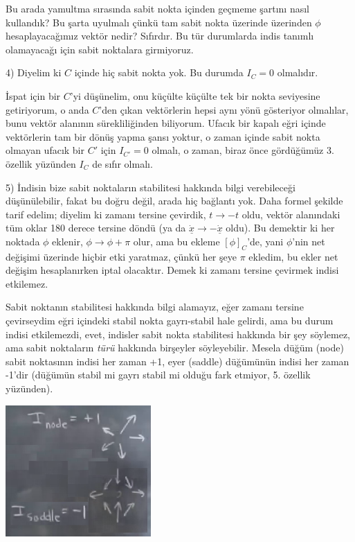 \documentclass[12pt,fleqn]{article}\usepackage{../../common}
\begin{document}
Bu arada yamultma sırasında sabit nokta içinden geçmeme şartını nasıl kullandık?
Bu şarta uyulmalı çünkü tam sabit nokta üzerinde üzerinden $\phi$
hesaplayacağımız vektör nedir? Sıfırdır. Bu tür durumlarda indis tanımlı
olamayacağı için sabit noktalara girmiyoruz.

4) Diyelim ki $C$ içinde hiç sabit nokta yok. Bu durumda $I_C = 0$
olmalıdır.

İspat için bir $C$'yi düşünelim, onu küçülte küçülte tek bir nokta seviyesine
getiriyorum, o anda $C$'den çıkan vektörlerin hepsi aynı yönü gösteriyor
olmalılar, bunu vektör alanının sürekliliğinden biliyorum. Ufacık bir kapalı
eğri içinde vektörlerin tam bir dönüş yapma şansı yoktur, o zaman içinde sabit
nokta olmayan ufacık bir $C'$ için $I_{C'} = 0$ olmalı, o zaman, biraz önce
gördüğümüz 3. özellik yüzünden $I_C$ de sıfır olmalı.

5) İndisin bize sabit noktaların stabilitesi hakkında bilgi verebileceği
düşünülebilir, fakat bu doğru değil, arada hiç bağlantı yok. Daha formel şekilde
tarif edelim; diyelim ki zamanı tersine çevirdik, $t \to -t$ oldu, vektör
alanındaki tüm oklar 180 derece tersine döndü (ya da $\dot{\underline{x}} \to
-\dot{\underline{x}}$ oldu). Bu demektir ki her noktada $\phi$ eklenir, $\phi \to
\phi + \pi$ olur, ama bu ekleme $[\phi]_C$'de, yani $\phi$'nin net değişimi
üzerinde hiçbir etki yaratmaz, çünkü her şeye $\pi$ ekledim, bu ekler net
değişim hesaplanırken iptal olacaktır. Demek ki zamanı tersine çevirmek indisi
etkilemez.

Sabit noktanın stabilitesi hakkında bilgi alamayız, eğer zamanı tersine
çevirseydim eğri içindeki stabil nokta gayrı-stabil hale gelirdi, ama bu durum
indisi etkilemezdi, evet, indisler sabit nokta stabilitesi hakkında bir şey
söylemez, ama sabit noktaların {\em türü} hakkında birşeyler
söyleyebilir. Mesela düğüm (node) sabit noktasının indisi her zaman +1, eyer
(saddle) düğümünün indisi her zaman -1'dir (düğümün stabil mi gayrı stabil mi
olduğu fark etmiyor, 5. özellik yüzünden).

\includegraphics[height=5cm]{08_29.png}
\end{document}
